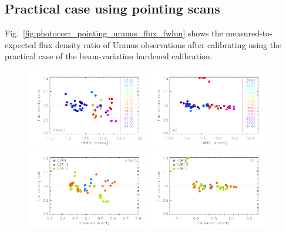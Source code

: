\subsection{Practical case using pointing scans}
\label{se:photocorr_pointing}


Fig.~\ref{fig:photocorr_pointing_uranus_flux_fwhm} shows the
measured-to-expected flux density ratio of Uranus observations after
calibrating using the practical case of the beam-variation
hardened calibration. 

\begin{figure}[ht!]
\begin{center}
\includegraphics[clip=true,width=0.47\textwidth]{Figures/Calibration/Photocorr/plot_flux_density_ratio_primaryphotocorr_pointing_1mm.pdf}
\includegraphics[clip=true,width=0.47\textwidth]{Figures/Calibration/Photocorr/plot_flux_density_ratio_primaryphotocorr_pointing_a2.pdf}
\includegraphics[clip=true,width=0.47\textwidth]{Figures/Calibration/Photocorr/plot_flux_density_ratio_obstau_primaryphotocorr_pointing_1mm.pdf}
\includegraphics[clip=true,width=0.47\textwidth]{Figures/Calibration/Photocorr/plot_flux_density_ratio_obstau_primaryphotocorr_pointing_a2.pdf}

\end{center}
\end{figure}

